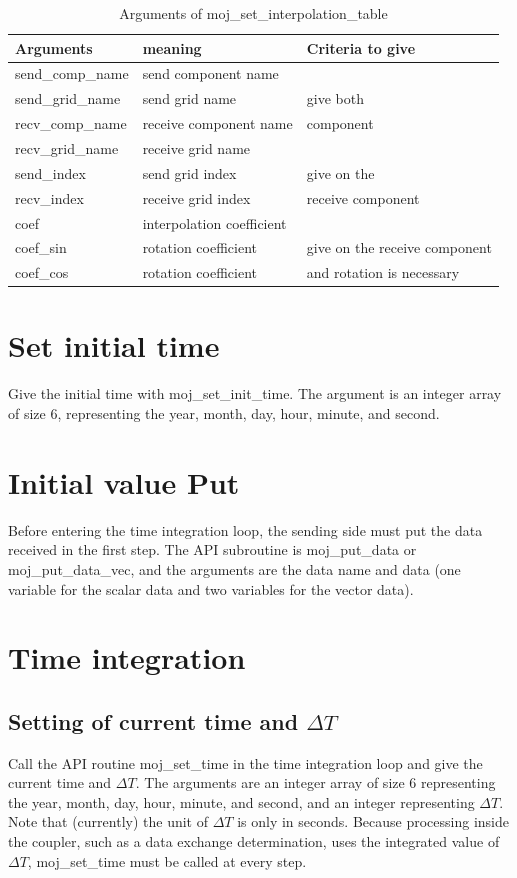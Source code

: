 \documentclass[11pt,a4paper]{report}
\begin{document}
\begin{table}[H]
\begin{center}
\caption{Arguments of moj\_set\_interpolation\_table}
{\small
\label{table:interpolation_table_arguments}
\begin{tabular}{|ll|l|}
\hline
 Arguments & meaning & Criteria to give　\\
\hline
 send\_comp\_name & send component name &\\
 send\_grid\_name & send grid name & give both\\
 recv\_comp\_name & receive component name & component\\
 recv\_grid\_name & receive grid name &　\\
\hline
 send\_index & send grid index & give on the \\
 recv\_index & receive grid index & receive component \\
 coef        & interpolation coefficient & \\
\hline
 coef\_sin   & rotation coefficient & give on the receive component\\
 coef\_cos   & rotation coefficient & and rotation is necessary\\
\hline
\end{tabular}
}
\end{center}
\end{table}


\section{Set initial time}
Give the initial time with moj\_set\_init\_time. 
The argument is an integer array of size 6, representing the year, month, day, hour, minute, and second.

\section{Initial value Put}
Before entering the time integration loop, the sending side must put the data received in the first step. The API subroutine is moj\_put\_data or moj\_put\_data\_vec, and the arguments are the data name and data (one variable for the scalar data and two variables for the vector data).

\section{Time integration}
\subsection{Setting of current time and $\Delta{T}$}
Call the API routine moj\_set\_time in the time integration loop and give the current time and $\Delta{T}$. The arguments are an integer array of size 6 representing the year, month, day, hour, minute, and second, and an integer representing $\Delta{T}$. 
Note that (currently) the unit of $\Delta{T}$ is only in seconds.
Because processing inside the coupler, such as a data exchange determination, uses the integrated value of $\Delta{T}$, moj\_set\_time must be called at every step.
\end{document}
